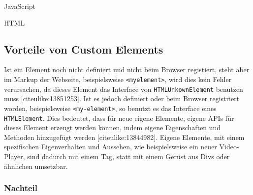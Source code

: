 JavaScript

\begin{Shaded}
\begin{Highlighting}[]
 \OperatorTok{=} \NormalTok{(}\NormalTok{)}\OperatorTok{;}
\OperatorTok{;}
\end{Highlighting}
\end{Shaded}

HTML

\begin{Shaded}
\begin{Highlighting}[]
\KeywordTok{>}
\end{Highlighting}
\end{Shaded}

\subsection{Vorteile von Custom
Elements}\label{vorteile-von-custom-elements}

Ist ein Element noch nicht definiert und nicht beim Browser registiert,
steht aber im Markup der Webseite, beispielsweise
\texttt{\textless{}myelement\textgreater{}}, wird dies kein Fehler
verursachen, da dieses Element das Interface von
\texttt{HTMLUnkownElement} benutzen muss {[}citeulike:13851253{]}. Ist
es jedoch definiert oder beim Browser registriert worden, beispielsweise
\texttt{\textless{}my-element\textgreater{}}, so benutzt es das
Interface eines \texttt{HTMLElement}. Dies bedeutet, dass für neue
eigene Elemente, eigene APIs für dieses Element erzeugt werden können,
indem eigene Eigenschaften und Methoden hinzugefügt werden
{[}citeulike:13844982{]}. Eigene Elemente, mit einem spezifischen
Eigenverhalten und Aussehen, wie beispielsweise ein neuer Video-Player,
sind dadurch mit einem Tag, statt mit einem Gerüst aus Divs oder
ähnlichen umsetzbar.

\subsubsection{Nachteil}\label{nachteil}

